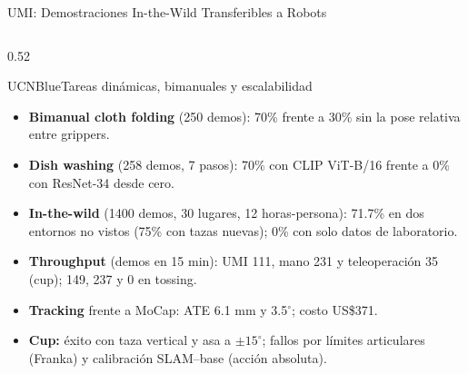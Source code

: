 \documentclass[aspectratio=169,10pt,xcolor={dvipsnames,table}]{beamer}
\newcommand{\CardHeightTall}{46mm}         %
\begin{document}
\begin{frame}{UMI: Demostraciones In-the-Wild Transferibles a Robots}
\begin{columns}[T, onlytextwidth]
\begin{column}{0.52\textwidth}
\begin{Card}[height=\CardHeightTall]{UCNBlue}{Tareas dinámicas, bimanuales y escalabilidad}
{\begin{itemize}
          \item[\textcolor{UCNBlue}{$\blacktriangleright$}] \textbf{Bimanual cloth folding} (250 demos): 70\% frente a 30\% sin la pose relativa entre grippers.
          \item[\textcolor{UCNBlue}{$\blacktriangleright$}] \textbf{Dish washing} (258 demos, 7 pasos): 70\% con CLIP ViT-B/16 frente a 0\% con ResNet-34 desde cero.
          \item[\textcolor{UCNBlue}{$\blacktriangleright$}] \textbf{In-the-wild} (1400 demos, 30 lugares, 12 horas-persona): 71.7\% en dos entornos no vistos (75\% con tazas nuevas); 0\% con solo datos de laboratorio.
          \item[\textcolor{UCNBlue}{$\blacktriangleright$}] \textbf{Throughput} (demos en 15 min): UMI 111, mano 231 y teleoperación 35 (cup); 149, 237 y 0 en tossing.
          \item[\textcolor{UCNBlue}{$\blacktriangleright$}] \textbf{Tracking} frente a MoCap: ATE 6.1 mm y 3.5$^\circ$; costo US\$371.
          \item[\textcolor{UCNBlue}{$\blacktriangleright$}] \textbf{Cup:} éxito con taza vertical y asa a $\pm 15^\circ$; fallos por límites articulares (Franka) y calibración SLAM--base (acción absoluta).
        \end{itemize}}
      \end{Card}
    \end{column}
  \end{columns}
\end{frame}
\end{document}
